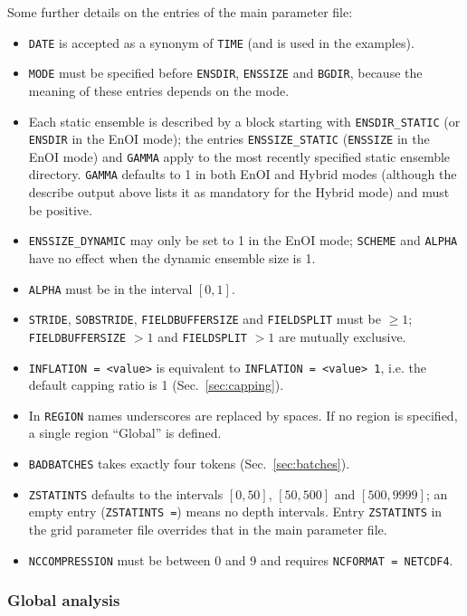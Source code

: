 \documentclass[11pt]{report}
\begin{document}
Some further details on the entries of the main parameter file:
\begin{itemize}
\item \verb|DATE| is accepted as a synonym of \verb|TIME| (and is used in the examples).
\item \verb|MODE| must be specified before \verb|ENSDIR|, \verb|ENSSIZE| and \verb|BGDIR|, because the meaning of these entries depends on the mode.
\item Each static ensemble is described by a block starting with \verb|ENSDIR_STATIC| (or \verb|ENSDIR| in the EnOI mode); the entries \verb|ENSSIZE_STATIC| (\verb|ENSSIZE| in the EnOI mode) and \verb|GAMMA| apply to the most recently specified static ensemble directory.
  \verb|GAMMA| defaults to 1 in both EnOI and Hybrid modes (although the describe output above lists it as mandatory for the Hybrid mode) and must be positive.
\item \verb|ENSSIZE_DYNAMIC| may only be set to 1 in the EnOI mode; \verb|SCHEME| and \verb|ALPHA| have no effect when the dynamic ensemble size is 1.
\item \verb|ALPHA| must be in the interval $[0, 1]$.
\item \verb|STRIDE|, \verb|SOBSTRIDE|, \verb|FIELDBUFFERSIZE| and \verb|FIELDSPLIT| must be $\ge 1$; \verb|FIELDBUFFERSIZE| $> 1$ and \verb|FIELDSPLIT| $> 1$ are mutually exclusive.
\item \verb|INFLATION = <value>| is equivalent to \verb|INFLATION = <value> 1|, i.e. the default capping ratio is 1 (Sec.~\ref{sec:capping}).
\item In \verb|REGION| names underscores are replaced by spaces. If no region is specified, a single region ``Global'' is defined.
\item \verb|BADBATCHES| takes exactly four tokens (Sec.~\ref{sec:batches}).
\item \verb|ZSTATINTS| defaults to the intervals $[0, 50]$, $[50, 500]$ and $[500, 9999]$; an empty entry (\verb|ZSTATINTS =|) means no depth intervals. Entry \verb|ZSTATINTS| in the grid parameter file overrides that in the main parameter file.
\item \verb|NCCOMPRESSION| must be between 0 and 9 and requires \verb|NCFORMAT = NETCDF4|.
\end{itemize}

\subsubsection{Global analysis}
\end{document}
